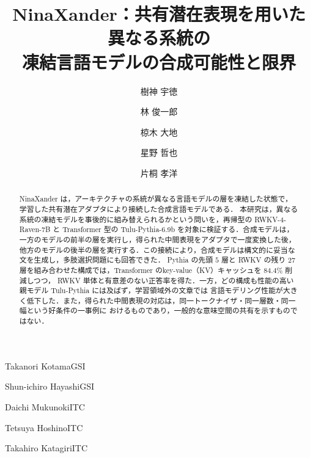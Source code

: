 \documentclass[techrep,noauthor]{ipsj}
\newcommand{\kw}[1]{#1}
\newcommand{\rev}[1]{{\color{blue}#1}}
\newcommand{\revr}[1]{{\color{red}#1}}
\begin{document}
\title{NinaXander：共有潜在表現を用いた異なる系統の\\凍結言語モデルの\rev{合成可能性と限界}}


\author{樹神 宇徳}{Takanori Kotama}{GSI}
\author{林 俊一郎}{Shun-ichiro Hayashi}{GSI}
\author{椋木 大地}{Daichi Mukunoki}{ITC}
\author{星野 哲也}{Tetsuya Hoshino}{ITC}
\author{片桐 孝洋}{Takahiro Katagiri}{ITC}

\begin{abstract}
\rev{\kw{NinaXander} は，\revr{アーキテクチャの系統}が異なる言語モデルの層を凍結した状態で，学習した共有潜在アダプタにより接続した合成言語モデルである．
本研究は，異なる系統の凍結モデルを事後的に組み替えられるかという問いを，再帰型の RWKV-4-Raven-7B と Transformer 型の
Tulu-Pythia-6.9b を対象に検証する．合成モデルは，一方のモデルの前半の層を実行し，得られた中間表現をアダプタで一度変換した後，
他方のモデルの後半の層を実行する．この接続により，合成モデルは構文的に妥当な文を生成し，多肢選択問題にも回答できた．
Pythia の先頭 $5$ 層と RWKV の残り $27$ 層を組み合わせた構成では，Transformer の\rev{key-value（KV）キャッシュ}を $84.4\%$ 削減しつつ，
RWKV 単体と有意差のない正答率を得た．一方，どの構成も性能の高い親モデル Tulu-Pythia には及ばず，学習領域外の文章では
言語モデリング性能が大きく低下した．また，得られた中間表現の対応は，同一トークナイザ・同一層数・同一幅という好条件の一事例に
おけるものであり，一般的な意味空間の共有を示すものではない．}
\end{abstract}

\maketitle
\end{document}
